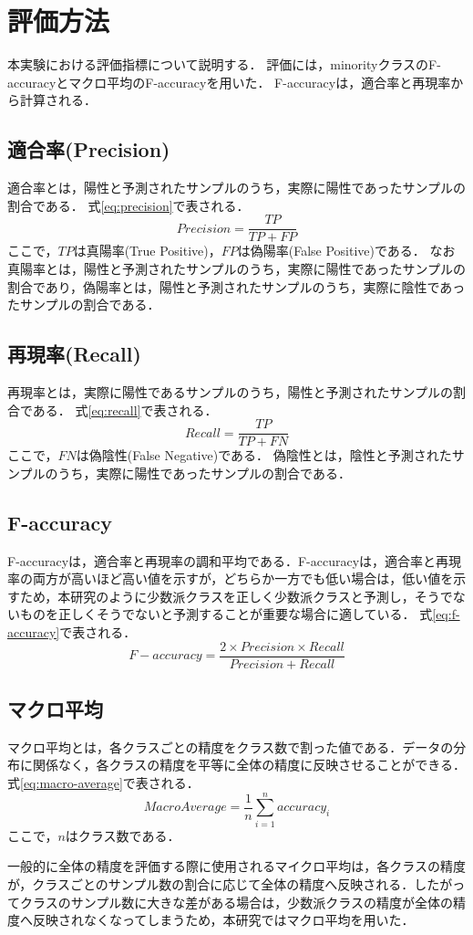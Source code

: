 \section{評価方法}
\label{sec:evaluation}
本実験における評価指標について説明する．
評価には，minorityクラスのF-accuracyとマクロ平均のF-accuracyを用いた．
F-accuracyは，適合率と再現率から計算される．
\subsection{適合率(Precision)}
適合率とは，陽性と予測されたサンプルのうち，実際に陽性であったサンプルの割合である．
式\ref{eq:precision}で表される．
\begin{equation}
    \label{eq:precision}
    Precision = \frac{TP}{TP + FP}
\end{equation}
ここで，$TP$は真陽率(True Positive)，$FP$は偽陽率(False Positive)である．
なお真陽率とは，陽性と予測されたサンプルのうち，実際に陽性であったサンプルの割合であり，偽陽率とは，陽性と予測されたサンプルのうち，実際に陰性であったサンプルの割合である．

\subsection{再現率(Recall)}
再現率とは，実際に陽性であるサンプルのうち，陽性と予測されたサンプルの割合である．
式\ref{eq:recall}で表される．
\begin{equation}
    \label{eq:recall}
    Recall = \frac{TP}{TP + FN}
\end{equation}
ここで，$FN$は偽陰性(False Negative)である．
偽陰性とは，陰性と予測されたサンプルのうち，実際に陽性であったサンプルの割合である．

\subsection{F-accuracy}
F-accuracyは，適合率と再現率の調和平均である．F-accuracyは，適合率と再現率の両方が高いほど高い値を示すが，どちらか一方でも低い場合は，低い値を示すため，本研究のように少数派クラスを正しく少数派クラスと予測し，そうでないものを正しくそうでないと予測することが重要な場合に適している．
式\ref{eq:f-accuracy}で表される．
\begin{equation}
    \label{eq:f-accuracy}
    F-accuracy = \frac{2 \times Precision \times Recall}{Precision + Recall}
\end{equation}

\subsection{マクロ平均}
マクロ平均とは，各クラスごとの精度をクラス数で割った値である．データの分布に関係なく，各クラスの精度を平等に全体の精度に反映させることができる．
式\ref{eq:macro-average}で表される．
\begin{equation}
    \label{eq:macro-average}
    Macro Average = \frac{1}{n}\sum_{i=1}^{n}accuracy_i
\end{equation}
ここで，$n$はクラス数である．

一般的に全体の精度を評価する際に使用されるマイクロ平均は，各クラスの精度が，クラスごとのサンプル数の割合に応じて全体の精度へ反映される．したがってクラスのサンプル数に大きな差がある場合は，少数派クラスの精度が全体の精度へ反映されなくなってしまうため，本研究ではマクロ平均を用いた．
